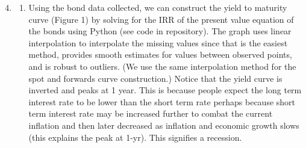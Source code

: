 \documentclass{article}
\begin{document}
\begin{enumerate}
\setcounter{enumi}{3} 
    \item \hfill
    \begin{enumerate}
        \item  
            Using the bond data collected, we can construct the yield to maturity curve \cite{hayes2023yield} (Figure 1) by solving for the IRR of the present value equation of the bonds using Python (see code in repository). The graph uses linear interpolation to interpolate the missing values since that is the easiest method, provides smooth estimates for values between observed points, and is robust to outliers. (We use the same interpolation method for the spot and forwards curve construction.) Notice that the yield curve is inverted and peaks at 1 year. This is because people expect the long term interest rate to be lower than the short term rate perhaps because short term interest rate may be increased further to combat the current inflation and then later decreased as inflation and economic growth slows (this explains the peak at 1-yr). This signifies a recession. 
            

\end{enumerate}
\end{enumerate}
\end{document}
